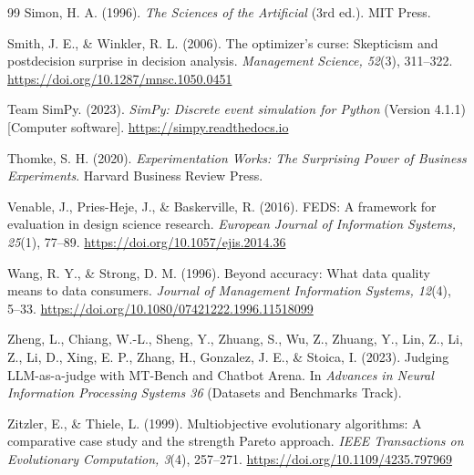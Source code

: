 \documentclass[preprint,12pt,authoryear]{elsarticle}
\providecommand{\doi}[1]{\url{https://doi.org/#1}}
\theoremstyle{definition}
\begin{document}
\begin{thebibliography}{99}
 Simon, H. A. (1996). \textit{The Sciences of the Artificial} (3rd ed.). MIT Press.

 Smith, J. E., \& Winkler, R. L. (2006). The optimizer's curse: Skepticism and postdecision surprise in decision analysis. \textit{Management Science, 52}(3), 311--322. \doi{10.1287/mnsc.1050.0451}

 Team SimPy. (2023). \textit{SimPy: Discrete event simulation for Python} (Version 4.1.1) [Computer software]. \url{https://simpy.readthedocs.io}

 Thomke, S. H. (2020). \textit{Experimentation Works: The Surprising Power of Business Experiments}. Harvard Business Review Press.

 Venable, J., Pries-Heje, J., \& Baskerville, R. (2016). FEDS: A framework for evaluation in design science research. \textit{European Journal of Information Systems, 25}(1), 77--89. \doi{10.1057/ejis.2014.36}

 Wang, R. Y., \& Strong, D. M. (1996). Beyond accuracy: What data quality means to data consumers. \textit{Journal of Management Information Systems, 12}(4), 5--33. \doi{10.1080/07421222.1996.11518099}

 Zheng, L., Chiang, W.-L., Sheng, Y., Zhuang, S., Wu, Z., Zhuang, Y., Lin, Z., Li, Z., Li, D., Xing, E. P., Zhang, H., Gonzalez, J. E., \& Stoica, I. (2023). Judging LLM-as-a-judge with MT-Bench and Chatbot Arena. In \textit{Advances in Neural Information Processing Systems 36} (Datasets and Benchmarks Track).

 Zitzler, E., \& Thiele, L. (1999). Multiobjective evolutionary algorithms: A comparative case study and the strength Pareto approach. \textit{IEEE Transactions on Evolutionary Computation, 3}(4), 257--271. \doi{10.1109/4235.797969}

\end{thebibliography}
\end{document}
